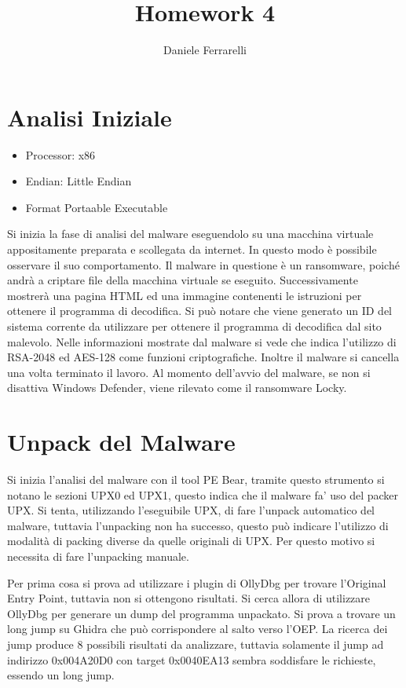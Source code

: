 \documentclass[a4paper,12pt]{article}
\title{Homework 4}
\author{Daniele Ferrarelli}
\date{}
\begin{document}
\maketitle
\tableofcontents

\section{Analisi Iniziale}
\begin{itemize}
	\item Processor: x86
	\item Endian: Little Endian
	\item Format Portaable Executable
\end{itemize}

Si inizia la fase di analisi del malware eseguendolo su una macchina virtuale appositamente preparata e scollegata  da internet. In questo modo è possibile osservare il suo comportamento. Il malware in questione è un ransomware, poiché andrà a criptare file della macchina virtuale se eseguito. Successivamente mostrerà una pagina HTML ed una immagine contenenti le istruzioni per ottenere il programma di decodifica. Si può notare che viene generato un ID del sistema corrente da utilizzare per ottenere il programma di decodifica dal sito malevolo. Nelle informazioni mostrate dal malware si vede che indica l'utilizzo di RSA-2048 ed AES-128 come funzioni criptografiche.  Inoltre il malware si cancella una volta terminato il lavoro. Al momento dell'avvio del malware, se non si disattiva Windows Defender, viene rilevato come il ransomware Locky. 

\section{Unpack del Malware}
Si inizia l'analisi del malware con il tool PE Bear, tramite questo strumento si notano le sezioni UPX0 ed UPX1, questo indica che il malware fa' uso del packer UPX. Si tenta, utilizzando l'eseguibile UPX, di fare l'unpack automatico del malware, tuttavia l'unpacking non ha successo, questo può indicare l'utilizzo di modalità di packing diverse da quelle originali di UPX. Per questo motivo si necessita di fare l'unpacking manuale.

Per prima cosa si prova ad utilizzare i plugin di OllyDbg per trovare l'Original Entry Point, tuttavia non si ottengono risultati.
Si cerca allora di utilizzare OllyDbg per generare un dump del programma unpackato. Si prova a trovare un long jump su Ghidra che può corrispondere al salto verso l'OEP. La ricerca dei jump produce 8 possibili risultati da analizzare, tuttavia solamente il jump ad indirizzo 0x004A20D0 con target 0x0040EA13 sembra soddisfare le richieste, essendo un long jump. 
\end{document}
